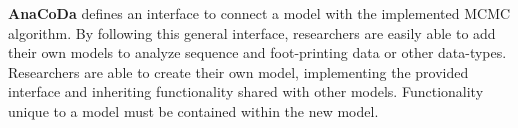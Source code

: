 \documentclass{bioinfo}
\newcommand{\package}{\textbf{AnaCoDa }} %
\begin{document}

\package defines an interface to connect a model with the implemented MCMC algorithm. 
By following this general interface, researchers are easily able to add their own models to analyze sequence and foot-printing data or other data-types.
Researchers are able to create their own model, implementing the provided interface and inheriting functionality shared with other models.
Functionality unique to a model must be contained within the new model. 





\end{document}
